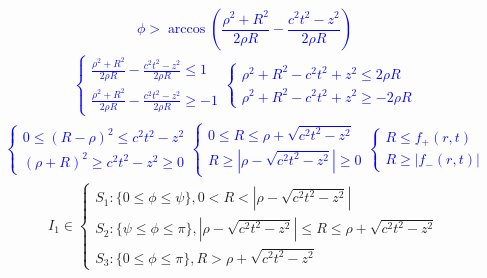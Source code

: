 %
\textcolor{blue}{ \begin{equation*}
\phi > \arccos \left( \frac{\rho^2 + R^2}{2 \rho R} - 
\frac{c^2 t^2 - z^2}{2 \rho R} \right)
\end{equation*} }
%
\textcolor{blue}{ \begin{equation*} \begin{aligned}
\begin{cases}
\frac{\rho^2 + R^2}{2 \rho R} - \frac{c^2 t^2 - z^2}{2 \rho R} \leq 1 \\
\frac{\rho^2 + R^2}{2 \rho R} - \frac{c^2 t^2 - z^2}{2 \rho R} \geq - 1
\end{cases}
\begin{cases}
\rho^2 + R^2 - c^2 t^2 + z^2 \leq 2 \rho R \\
\rho^2 + R^2 - c^2 t^2 + z^2 \geq - 2 \rho R
\end{cases}
\end{aligned} \end{equation*} }
%
\textcolor{blue}{ \begin{equation*} \begin{aligned}
\begin{cases}
0 \leq \left( R - \rho \right)^2 \leq c^2 t^2 - z^2 \\ 
\left( \rho + R \right)^2 \geq c^2 t^2 - z^2 \geq 0
\end{cases}
\begin{cases}
0 \leq R \leq \rho + \sqrt{c^2 t^2 - z^2} \\
R \geq \left| \rho - \sqrt{c^2 t^2 - z^2} \right| \geq 0
\end{cases}
\begin{cases}
R \leq f_+(r,t) \\
R \geq \left| f_-(r,t) \right|
\end{cases} 
\end{aligned} \end{equation*} }
%
\begin{equation*} \begin{aligned}
I_1 \in \begin{cases}
S_1: \{ 0 \leq \phi \leq \psi \}, 0 < R < 
\left| \rho - \sqrt{c^2 t^2 - z^2} \right| \\
S_2: \{ \psi \leq \phi \leq \pi \}, \left| \rho - \sqrt{c^2 t^2 - z^2} \right| \leq 
R \leq \rho + \sqrt{c^2 t^2 - z^2} \\
S_3: \{ 0 \leq \phi \leq \pi \}, R > \rho + \sqrt{c^2 t^2 - z^2}
\end{cases} 
\end{aligned} \end{equation*}
